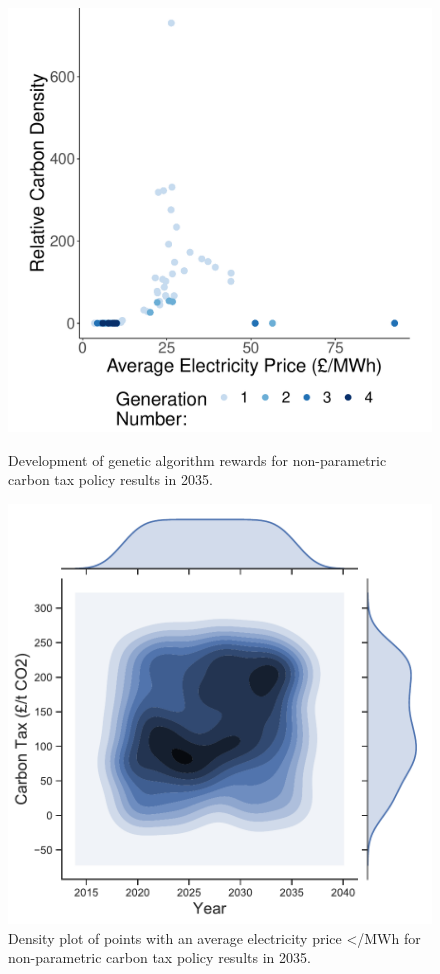 \begin{figure}
	\centering
	\includegraphics[width=0.72\linewidth]{Chapter6/figures/results/free_points_ga_development}
	\caption{Development of genetic algorithm rewards for non-parametric carbon tax policy results in 2035.}
	\label{fig:free_points_ga_development}
	\includegraphics[width=0.71\linewidth]{Chapter6/figures/results/best_heatmap_no_marginals}
	\caption{Density plot of points with an average electricity price </MWh for non-parametric carbon tax policy results in 2035.}
	\label{fig:heatmap_of_free_points}
\end{figure}



